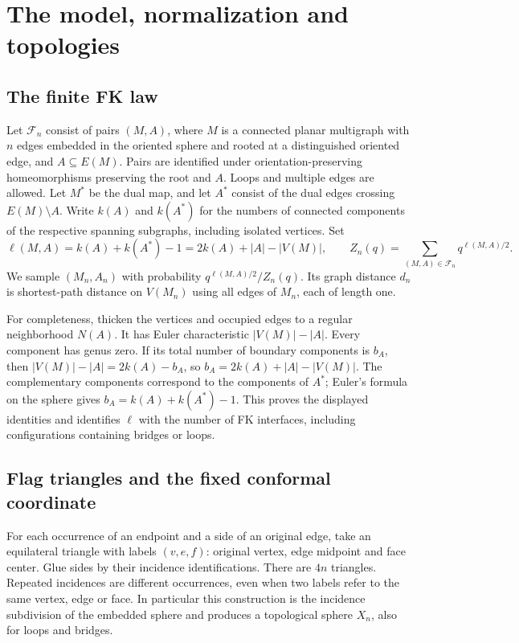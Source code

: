 \section{The model, normalization and topologies}\label{intro:model-section}

\subsection{The finite FK law}

\begin{definition}\label{intro:finite-law}
Let $\mathcal F_n$ consist of pairs $(M,A)$, where $M$ is a connected
planar multigraph with $n$ edges embedded in the oriented sphere and
rooted at a distinguished oriented edge, and $A\subseteq E(M)$.
Pairs are identified under orientation-preserving homeomorphisms
preserving the root and $A$. Loops and multiple edges are allowed.
Let $M^*$ be the dual map, and let $A^*$ consist of the dual edges
crossing $E(M)\setminus A$. Write $k(A)$ and $k(A^*)$ for the numbers
of connected components of the respective spanning subgraphs,
including isolated vertices. Set
\[
 \ell(M,A)=k(A)+k(A^*)-1
         =2k(A)+|A|-|V(M)|,
 \qquad
 Z_n(q)=\sum_{(M,A)\in\mathcal F_n}q^{\ell(M,A)/2}.
\]
We sample $(M_n,A_n)$ with probability
$q^{\ell(M,A)/2}/Z_n(q)$. Its graph distance $d_n$ is shortest-path
distance on $V(M_n)$ using all edges of $M_n$, each of length one.
\end{definition}

For completeness, thicken the vertices and occupied edges to a regular
neighborhood $N(A)$. It has Euler characteristic $|V(M)|-|A|$.
Every component has genus zero. If its total number of boundary
components is $b_A$, then
$|V(M)|-|A|=2k(A)-b_A$, so $b_A=2k(A)+|A|-|V(M)|$.
The complementary components correspond to the components of $A^*$;
Euler's formula on the sphere gives $b_A=k(A)+k(A^*)-1$.
This proves the displayed identities and identifies $\ell$ with the
number of FK interfaces, including configurations containing bridges
or loops.

\subsection{Flag triangles and the fixed conformal coordinate}

For each occurrence of an endpoint and a side of an original edge,
take an equilateral triangle with labels $(v,e,f)$: original vertex,
edge midpoint and face center. Glue sides by their incidence
identifications. There are $4n$ triangles. Repeated incidences are
different occurrences, even when two labels refer to the same vertex,
edge or face. In particular this construction is the incidence
subdivision of the embedded sphere and produces a topological sphere
$X_n$, also for loops and bridges.


